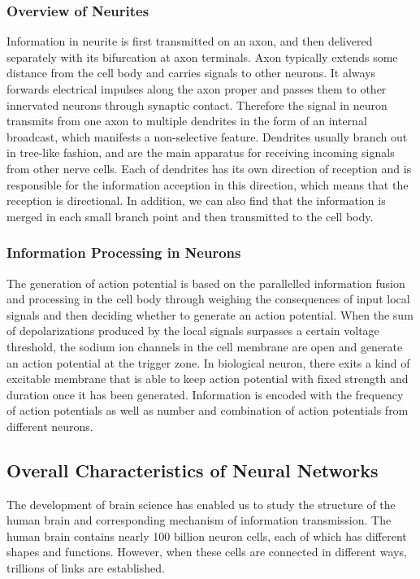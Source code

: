 \documentclass[journal,comsoc]{IEEEtran}
\begin{document}
			\subsubsection{Overview of Neurites}
				Information in neurite is first transmitted on an axon, and then delivered separately with its bifurcation at axon terminals. 
				Axon typically extends some distance from the cell body and carries signals to other neurons.
				It always forwards electrical impulses along the axon proper and passes them to other innervated neurons through synaptic contact. 
				Therefore the signal in neuron transmits from one axon to multiple dendrites in the form of an internal broadcast, which manifests a non-selective feature.
				Dendrites usually branch out in tree-like fashion, and are the main apparatus for receiving incoming signals from other nerve cells. 
				Each of dendrites has its own direction of reception and is responsible for the information acception in this direction, which means that the reception is directional. 
				In addition, we can also find that the information is merged in each small branch point and then transmitted to the cell body.			
			
			\subsubsection{Information Processing in Neurons}
				The generation of action potential is based on the parallelled information fusion and processing in the cell body through weighing the consequences of input local signals and then deciding whether to generate an action potential. 
				When the sum of depolarizations produced by the local signals surpasses a certain voltage threshold, the sodium ion channels in the cell membrane are open and generate an action potential at the trigger zone. 
				In biological neuron, there exits a kind of excitable membrane that is able to keep action potential with fixed strength and duration once it has been generated.
				Information is encoded with the frequency of action potentials as well as number and combination of action potentials from different neurons\cite{bear2007neuroscience}. 
				
		\subsection{Overall Characteristics of Neural Networks}
			The development of brain science has enabled us to study the structure of the human brain and corresponding mechanism of information transmission.
			The human brain contains nearly 100 billion neuron cells, each of which has different shapes and functions.
			However, when these cells are connected in different ways, trillions of links are established.
			
\end{document}
